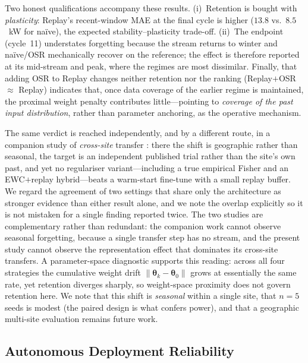 \documentclass[journal]{IEEEtran}
\newcommand{\params}{\bm{\theta}}
\begin{document}
Two honest qualifications accompany these results. (i)~Retention is bought
with \emph{plasticity}: Replay's recent-window MAE at the final cycle is
higher ($13.8$ vs.\ $8.5$~kW for na\"ive), the expected stability--plasticity
trade-off. (ii)~The endpoint (cycle~11) understates forgetting because the
stream returns to winter and na\"ive/OSR mechanically recover on the
reference; the effect is therefore reported at its mid-stream and peak, where
the regimes are most dissimilar. Finally, that adding OSR to Replay changes
neither retention nor the ranking (Replay${+}$OSR $\approx$ Replay) indicates
that, once data coverage of the earlier regime is maintained, the proximal
weight penalty contributes little---pointing to \emph{coverage of the past
input distribution}, rather than parameter anchoring, as the operative
mechanism.

The same verdict is reached independently, and by a different route, in a
companion study of \emph{cross-site} transfer
\cite{dabaghia2026representation}: there the shift is geographic rather than
seasonal, the target is an independent published trial rather than the site's
own past, and yet no regulariser variant---including a true empirical Fisher
and an EWC${+}$replay hybrid---beats a warm-start fine-tune with a small
replay buffer. We regard the agreement of two settings that share only the
architecture as stronger evidence than either result alone, and we note the
overlap explicitly so it is not mistaken for a single finding reported twice.
The two studies are complementary rather than redundant: the companion work
cannot observe seasonal forgetting, because a single transfer step has no
stream, and the present study cannot observe the representation effect that
dominates its cross-site transfers. A parameter-space diagnostic supports this reading: across all
four strategies the cumulative weight drift $\lVert\params_k-\params_0\rVert$
grows at essentially the same rate, yet retention diverges sharply, so
weight-space proximity does not govern retention here. We note that this shift
is \emph{seasonal} within a single site, that $n{=}5$ seeds is modest (the
paired design is what confers power), and that a geographic multi-site
evaluation remains future work.
\subsection{Autonomous Deployment Reliability}
\label{sec:results_deployment}
\end{document}
